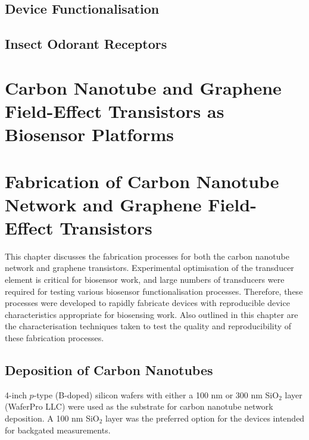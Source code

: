 \documentclass[
  a4paper,
]{scrbook}
\begin{document}
\hypertarget{device-functionalisation}{%
\section{Device Functionalisation}\label{device-functionalisation}}

\hypertarget{insect-odorant-receptors}{%
\section{Insect Odorant Receptors}\label{insect-odorant-receptors}}


\hypertarget{carbon-nanotube-and-graphene-field-effect-transistors-as-biosensor-platforms}{%
\chapter{Carbon Nanotube and Graphene Field-Effect Transistors as
Biosensor
Platforms}\label{carbon-nanotube-and-graphene-field-effect-transistors-as-biosensor-platforms}}


\hypertarget{sec-fabrication}{%
\chapter{Fabrication of Carbon Nanotube Network and Graphene
Field-Effect Transistors}\label{sec-fabrication}}

This chapter discusses the fabrication processes for both the carbon
nanotube network and graphene transistors. Experimental optimisation of
the transducer element is critical for biosensor work, and large numbers
of transducers were required for testing various biosensor
functionalisation processes. Therefore, these processes were developed
to rapidly fabricate devices with reproducible device characteristics
appropriate for biosensing work. Also outlined in this chapter are the
characterisation techniques taken to test the quality and
reproducibility of these fabrication processes.

\hypertarget{deposition-of-carbon-nanotubes}{%
\section{Deposition of Carbon
Nanotubes}\label{deposition-of-carbon-nanotubes}}

4-inch \(p\)-type (B-doped) silicon wafers with either a 100 nm or 300
nm SiO\(_2\) layer (WaferPro LLC) were used as the substrate for carbon
nanotube network deposition. A 100 nm SiO\(_2\) layer was the preferred
option for the devices intended for backgated measurements.
\end{document}
